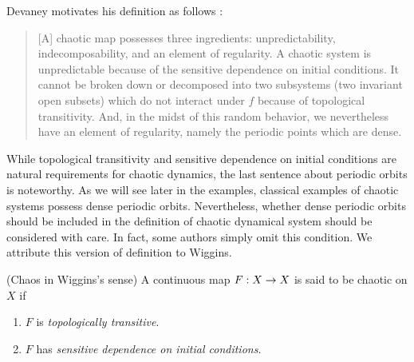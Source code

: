 \documentclass[12pt,draft,twoside]{book}
\begin{document}
Devaney motivates his definition as follows \citep[p.50]{devaney}:
\begin{quotation}
  [A] chaotic map possesses three ingredients:
  unpredictability, indecomposability, and an element of regularity.
  A chaotic system is unpredictable because of the sensitive dependence on initial conditions.
  It cannot be broken down or decomposed into two subsystems (two invariant open subsets) which do not interact under $f$ because of topological transitivity.
  And, in the midst of this random behavior, we nevertheless have an element of regularity, namely the periodic points which are dense.
\end{quotation}
While topological transitivity and sensitive dependence on initial conditions are natural requirements for chaotic dynamics, the last sentence about periodic orbits is noteworthy.
As we will see later in the examples, classical examples of chaotic systems possess dense periodic orbits.
Nevertheless, whether dense periodic orbits should be included in the definition of chaotic dynamical system should be considered with care.
In fact, some authors simply omit this condition.
We attribute this version of definition to Wiggins.
\begin{definition}
  (Chaos in Wiggins's sense)
  A continuous map $F: X\rightarrow X$ is said to be chaotic on $X$ if
  \begin{enumerate}
    \item $F$ is \textit{topologically transitive}.
    \item $F$ has \textit{sensitive dependence on initial conditions}.
  \end{enumerate}
\end{definition}
\end{document}
